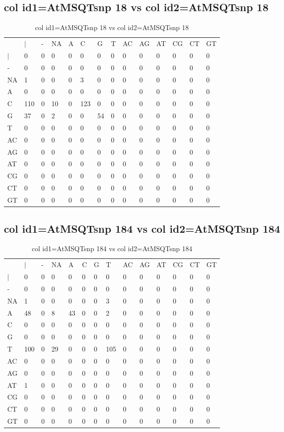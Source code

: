 \subsection{col id1=AtMSQTsnp 18 vs col id2=AtMSQTsnp 18}
\begin{center}
\begin{longtable}{|l|l|l|l|l|l|l|l|l|l|l|l|l|l|}
\caption{col id1=AtMSQTsnp 18 vs col id2=AtMSQTsnp 18} \label{table_dm746}\\
\hline
\\
\hline
&$|$&-&NA&A&C&G&T&AC&AG&AT&CG&CT&GT\\
$|$&0&0&0&0&0&0&0&0&0&0&0&0&0\\
-&0&0&0&0&0&0&0&0&0&0&0&0&0\\
NA&1&0&0&0&3&0&0&0&0&0&0&0&0\\
A&0&0&0&0&0&0&0&0&0&0&0&0&0\\
C&110&0&10&0&123&0&0&0&0&0&0&0&0\\
G&37&0&2&0&0&54&0&0&0&0&0&0&0\\
T&0&0&0&0&0&0&0&0&0&0&0&0&0\\
AC&0&0&0&0&0&0&0&0&0&0&0&0&0\\
AG&0&0&0&0&0&0&0&0&0&0&0&0&0\\
AT&0&0&0&0&0&0&0&0&0&0&0&0&0\\
CG&0&0&0&0&0&0&0&0&0&0&0&0&0\\
CT&0&0&0&0&0&0&0&0&0&0&0&0&0\\
GT&0&0&0&0&0&0&0&0&0&0&0&0&0\\
\hline
\end{longtable}
\end{center}

\subsection{col id1=AtMSQTsnp 184 vs col id2=AtMSQTsnp 184}
\begin{center}
\begin{longtable}{|l|l|l|l|l|l|l|l|l|l|l|l|l|l|}
\caption{col id1=AtMSQTsnp 184 vs col id2=AtMSQTsnp 184} \label{table_dm748}\\
\hline
\\
\hline
&$|$&-&NA&A&C&G&T&AC&AG&AT&CG&CT&GT\\
$|$&0&0&0&0&0&0&0&0&0&0&0&0&0\\
-&0&0&0&0&0&0&0&0&0&0&0&0&0\\
NA&1&0&0&0&0&0&3&0&0&0&0&0&0\\
A&48&0&8&43&0&0&2&0&0&0&0&0&0\\
C&0&0&0&0&0&0&0&0&0&0&0&0&0\\
G&0&0&0&0&0&0&0&0&0&0&0&0&0\\
T&100&0&29&0&0&0&105&0&0&0&0&0&0\\
AC&0&0&0&0&0&0&0&0&0&0&0&0&0\\
AG&0&0&0&0&0&0&0&0&0&0&0&0&0\\
AT&1&0&0&0&0&0&0&0&0&0&0&0&0\\
CG&0&0&0&0&0&0&0&0&0&0&0&0&0\\
CT&0&0&0&0&0&0&0&0&0&0&0&0&0\\
GT&0&0&0&0&0&0&0&0&0&0&0&0&0\\
\hline
\end{longtable}
\end{center}

